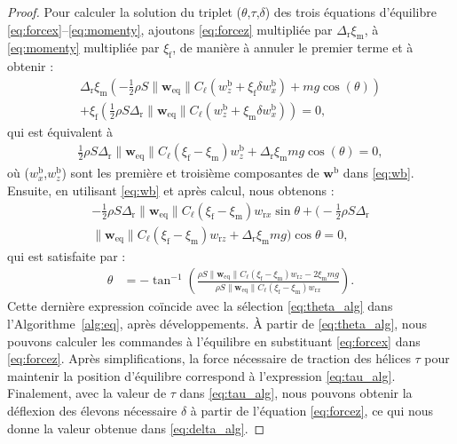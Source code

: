 \begin{proof}
        Pour calculer la solution du triplet ($\theta$,$\tau$,$\delta$) des trois équations d'équilibre \eqref{eq:forcex}--\eqref{eq:momenty}, ajoutons \eqref{eq:forcez} multipliée par $\Delta_{\text{r}} \xi_{\text{m}}$, à \eqref{eq:momenty} multipliée par $\xi_{\text{f}}$, de manière à annuler le premier terme et à obtenir : 
        \begin{multline*}
            \Delta_{\text{r}} \xi_{\text{m}} \left( - \frac{1}{2}\rho S \lVert \boldsymbol{w}_{\mathrm{eq}} \rVert C_{\ell} (w_{z}^{\text{b}} + \xi_{\text{f}} \delta w_{x}^{\text{b}}) + mg \cos(\theta) \right) \\+ \xi_{\text{f}} \left(\frac{1}{2}\rho S  \Delta_{\text{r}} \lVert \boldsymbol{w}_{\mathrm{eq}} \rVert C_{\ell} (w_{z}^{\text{b}} + \xi_{\text{m}} \delta w_{x}^{\text{b}})  \right) = 0,
        \end{multline*}
        qui est équivalent à
        \begin{align*}
            \frac{1}{2}\rho S  \Delta_{\text{r}} \lVert \boldsymbol{w}_{\mathrm{eq}} \rVert C_{\ell}  (\xi_{\text{f}} - \xi_{\text{m}}) w_{z}^{\text{b}} +   \Delta_{\text{r}} \xi_{\text{m}} mg \cos(\theta)  = 0,
        \end{align*}
        où ($w_{x}^{\text{b}}$,$w_{z}^{\text{b}}$) sont les première et troisième composantes de $\boldsymbol{w}^{\text{b}}$ dans \eqref{eq:wb}. Ensuite, en utilisant \eqref{eq:wb} et après calcul, nous obtenons : 
        \begin{multline*}
                -\frac{1}{2}\rho S  \Delta_{\text{r}} \lVert \boldsymbol{w}_{\mathrm{eq}} \rVert C_{\ell}  (\xi_{\text{f}} - \xi_{\text{m}}) w_{\text{r}x} \sin{\theta}  +\bigg( -\frac{1}{2}\rho S  \Delta_{\text{r}} \\ \lVert \boldsymbol{w}_{\mathrm{eq}} \rVert C_{\ell}  (\xi_{\text{f}} - \xi_{\text{m}})w_{\text{r}z} +   \Delta_{\text{r}} \xi_{\text{m}} mg \bigg) \cos{\theta} = 0,
        \end{multline*}
        qui est satisfaite par :
            \begin{align} \label{eq:theta}
                \theta &=  -\tan^{-1}\left(\frac{\rho S \lVert \boldsymbol{w}_{\mathrm{eq}} \rVert C_{\ell}  (\xi_{\text{f}} - \xi_{\text{m}})w_{\text{r}z} - 2 \xi_{\text{m}} mg }{\rho S\lVert \boldsymbol{w}_{\mathrm{eq}} \rVert C_{\ell}  (\xi_{\text{f}} - \xi_{\text{m}}) w_{\text{r}x}}\right).
            \end{align}
        Cette dernière expression coïncide avec la sélection \eqref{eq:theta_alg} dans l'Algorithme~\ref{alg:eq}, après développements.
        À partir de \eqref{eq:theta_alg}, nous pouvons calculer les commandes à l'équilibre en substituant \eqref{eq:forcex} dans \eqref{eq:forcez}. Après simplifications, la force nécessaire de traction des hélices  $\tau$ pour maintenir la position d'équilibre correspond à l'expression  \eqref{eq:tau_alg}. Finalement, avec la valeur de $\tau$ dans \eqref{eq:tau_alg}, nous pouvons obtenir la déflexion des élevons nécessaire $\delta$ à partir de l'équation \eqref{eq:forcez}, ce qui nous donne la valeur obtenue dans \eqref{eq:delta_alg}.
    \end{proof}
